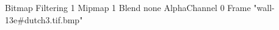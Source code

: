 {Bitmap
	{Filtering 1}
	{Mipmap 1}
	{Blend none}
	{AlphaChannel 0}
	{Frame "wall-13e#dutch3.tif.bmp"}
}
